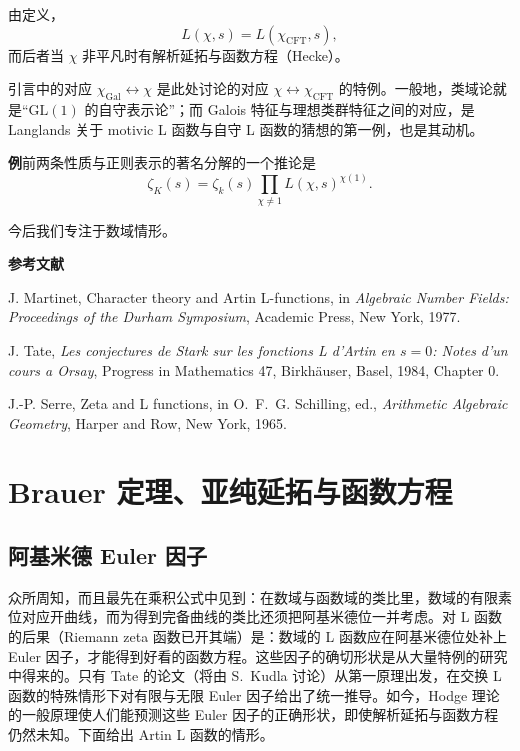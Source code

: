 由定义，
\begin{equation}\tag{3.15}\label{c4:eq:3.15}
L(\chi,s)=L(\chi_{\mathrm{CFT}},s),
\end{equation}
而后者当 $\chi$ 非平凡时有解析延拓与函数方程（Hecke）。

引言中的对应 $\chi_{\mathrm{Gal}}\leftrightarrow\chi$ 是此处讨论的对应 $\chi\leftrightarrow\chi_{\mathrm{CFT}}$ 的特例。一般地，类域论就是“$\mathrm{GL}(1)$ 的自守表示论”；而 Galois 特征与理想类群特征之间的对应，是 Langlands 关于 motivic L 函数与自守 L 函数的猜想的第一例，也是其动机。

\par\medskip\noindent\textbf{例}\quad 前两条性质与正则表示的著名分解的一个推论是
\begin{equation}\tag{3.16}\label{c4:eq:3.16}
\zeta_K(s)=\zeta_k(s)\prod_{\chi\neq1}L(\chi,s)^{\chi(1)} .
\end{equation}

今后我们专注于数域情形。

{\small
\par\medskip\noindent\textbf{参考文献}\par\nopagebreak
\noindent[1] J. Martinet, Character theory and Artin L-functions, in \emph{Algebraic Number Fields: Proceedings of the Durham Symposium}, Academic Press, New York, 1977.\par
\noindent[2] J. Tate, \emph{Les conjectures de Stark sur les fonctions L d'Artin en $s=0$: Notes d'un cours a Orsay}, Progress in Mathematics 47, Birkh\"auser, Basel, 1984, Chapter 0.\par
\noindent[3] J.-P. Serre, Zeta and L functions, in O.~F.~G. Schilling, ed., \emph{Arithmetic Algebraic Geometry}, Harper and Row, New York, 1965.\par
}

\section{Brauer 定理、亚纯延拓与函数方程}\label{c4:sec:4}

\subsection{阿基米德 Euler 因子}\label{c4:sec:4.1}

众所周知，而且最先在乘积公式中见到：在数域与函数域的类比里，数域的有限素位对应开曲线，而为得到完备曲线的类比还须把阿基米德位一并考虑。对 L 函数的后果（Riemann zeta 函数已开其端）是：数域的 L 函数应在阿基米德位处补上 Euler 因子，才能得到好看的函数方程。这些因子的确切形状是从大量特例的研究中得来的。只有 Tate 的论文（将由 S.~Kudla 讨论）从第一原理出发，在交换 L 函数的特殊情形下对有限与无限 Euler 因子给出了统一推导。如今，Hodge 理论的一般原理使人们能预测这些 Euler 因子的正确形状，即使解析延拓与函数方程仍然未知。下面给出 Artin L 函数的情形。

